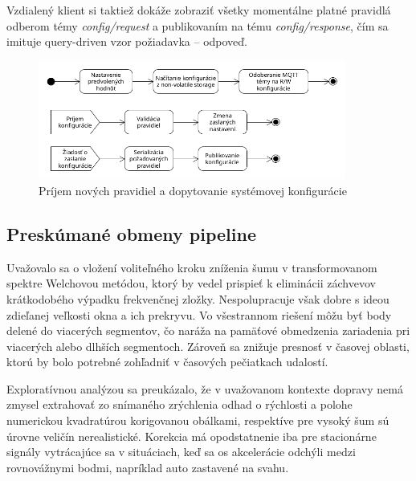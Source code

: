 Vzdialený klient si taktiež dokáže zobraziť všetky momentálne platné pravidlá odberom témy \emph{config/request} a publikovaním na tému 
\emph{config/response}, čím sa imituje query-driven vzor požiadavka -- odpoveď.

\begin{figure}[h]
	\centering
	\includegraphics[width=0.9\textwidth]{figures/design/configuration.png}
	\caption{Príjem nových pravidiel a dopytovanie systémovej konfigurácie}
	\label{config-change}
\end{figure}

\subsection{Preskúmané obmeny pipeline}
Uvažovalo sa o vložení voliteľného kroku zníženia šumu v transformovanom spektre Welchovou metódou, ktorý by vedel prispieť
k eliminácii záchvevov krátkodobého výpadku frekvenčnej zložky. Nespolupracuje však dobre s ideou zdieľanej veľkosti okna a
ich prekryvu. Vo všestrannom riešení môžu byť body delené do viacerých segmentov, čo naráža na pamäťové obmedzenia zariadenia
pri viacerých alebo dlhších segmentoch. Zároveň sa znižuje presnosť v časovej oblasti, ktorú by bolo potrebné zohľadniť v časových
pečiatkach udalostí.

Exploratívnou analýzou sa preukázalo, že v uvažovanom kontexte dopravy nemá zmysel extrahovať zo snímaného zrýchlenia odhad
o rýchlosti a polohe numerickou kvadratúrou korigovanou obálkami, respektíve pre vysoký šum sú úrovne veličín nerealistické.
Korekcia má opodstatnenie iba pre stacionárne signály vytrácajúce sa v situáciach, keď sa os akcelerácie odchýli medzi
rovnovážnymi bodmi, napríklad auto zastavené na svahu.

